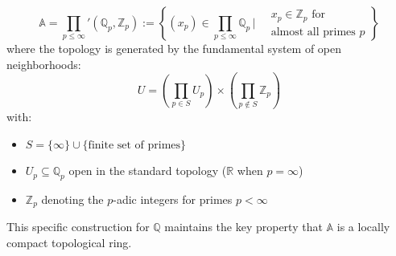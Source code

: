 \documentclass[11pt]{article}
\theoremstyle{remark}
\begin{document}
\begin{equation*}
\mathbb{A}= {\prod_{p \leq \infty}}'\left(\mathbb{Q}_p, \mathbb{Z}_p\right) := 
\left\{ 
    (x_p) \in \prod_{p \leq \infty} \mathbb{Q}_p \,\bigg|\, 
    \begin{aligned}
        &x_p \in \mathbb{Z}_p \text{ for } \\
        &\text{almost all primes } p 
    \end{aligned}
\right\}
\end{equation*}
where the topology is generated by the fundamental system of open neighborhoods:
\begin{equation*}
U = \left( \prod_{p \in S} U_p \right) \times \left( \prod_{p \notin S} \mathbb{Z}_p \right)
\end{equation*}
with:
\begin{itemize}
    \item $S = \{\infty\} \cup \{\text{finite set of primes}\}$
    \item $U_p \subseteq \mathbb{Q}_p$ open in the standard topology ($\mathbb{R}$ when $p=\infty$)
    \item $\mathbb{Z}_p$ denoting the $p$-adic integers for primes $p < \infty$
\end{itemize}

This specific construction for $\mathbb{Q}$ maintains the key property that $\mathbb{A}$ is a locally compact topological ring.
\end{document}
